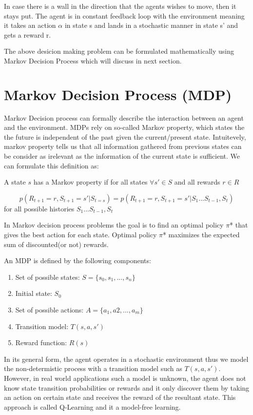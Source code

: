 \documentclass[10pt,a4paper,twocolumn]{article}
\begin{document}
	In case there is a wall in the direction that the agents wishes to move, then it stays put.
	The agent is in constant feedback loop with the environment meaning it takes an action $\alpha$ in state s and lands in a stochastic manner in state s’ and gets a reward r.
	
	The above desicion making problem can be formulated mathematically using Markov Decision Process which will discuss in next section.
	
	\section{Markov Decision Process (MDP)}
	
	Markov Decision process can formally describe the interaction between an agent and the environment. MDPs rely on so-called Markov property, which states the the future is independent of the past given the current/present state. Intuitevely, markov property tells us that all information gathered from previous states can be consider as irelevant as the information of the current state is sufficient. We can formulate this definition as:
	
	A state $s$ has a Markov property if for all states $\forall{s'} \in S$ and all rewards $r \in R$
	
	\begin{equation}
		p(R_{t+1} = r , S_{t+1}=s' | S_{t=s}) = p(R_{t+1} = r , S_{t+1}=s' | S_{1} ... S_{t-1}, S_{t})
	\end{equation}
	for all possible histories $ S_{1} ... S_{t-1}, S_{t} $
	
	
	In Markov decision process problems the goal is to find an optimal policy $\pi$* that gives  the best action for each state. Optimal policy $\pi$* maximizes the expected sum of discounted(or not) rewards.
	
	An MDP is defined by the following components:
	\begin{enumerate}
		\item Set of possible states: $S = \{ s_{0}, s_{1}, ..., s_{n} \}$
		\item Initial state: $S_{0}$
		\item Set of possible actions: $A = \{ a_{1}, a{2}, ..., a_{m} \}$
		\item Transition model: $T(s, a, s')$
		\item Reward function: $R(s)$
	\end{enumerate}

	In its general form, the agent operates in a stochastic environment thus we model the non-determistic process with a transition model such as $T(s,a,s')$. However, in real world applications such a model is unknown, the agent does not know state transition probabilities or rewards and it only discover them by taking an action on certain state and receives the reward of the resultant state. This approach is called Q-Learning and it a model-free learning.
	
\end{document}
